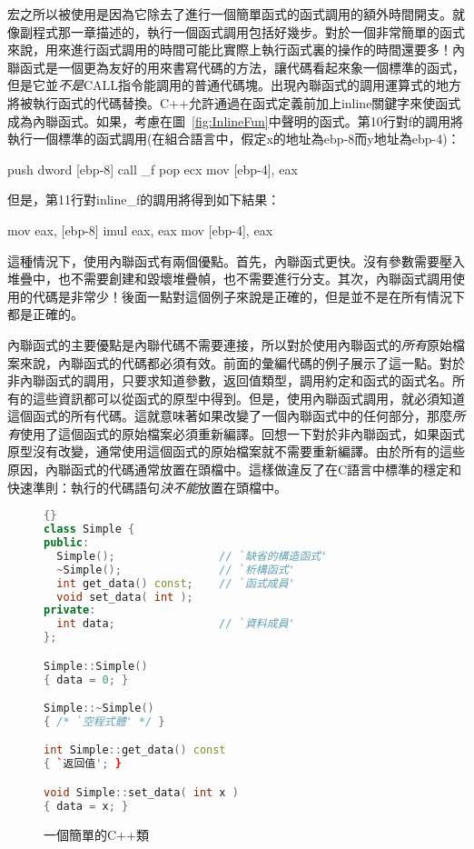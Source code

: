 宏之所以被使用是因為它除去了進行一個簡單函式的函式調用的額外時間開支。就像副程式那一章描述的，執行一個函式調用包括好幾步。對於一個非常簡單的函式來說，用來進行函式調用的時間可能比實際上執行函式裏的操作的時間還要多！內聯函式是一個更為友好的用來書寫代碼的方法，讓代碼看起來象一個標準的函式，但是它並\emph{不是}{\code CALL}指令能調用的普通代碼塊。出現內聯函式的調用運算式的地方將被執行函式的代碼替換。C++允許通過在函式定義前加上{\code inline}關鍵字來使函式成為內聯函式。如果，考慮在圖~\ref{fig:InlineFun}中聲明的函式。第10行對{\code f}的調用將執行一個標準的函式調用(在組合語言中，假定{\code x}的地址為{\code ebp-8}而{\code y}地址為{\code ebp-4})：
\begin{AsmCodeListing}
      push   dword [ebp-8]
      call   _f
      pop    ecx
      mov    [ebp-4], eax
\end{AsmCodeListing}
但是，第11行對{\code inline\_f}的調用將得到如下結果：
\begin{AsmCodeListing}
      mov    eax, [ebp-8]
      imul   eax, eax
      mov    [ebp-4], eax
\end{AsmCodeListing}

這種情況下，使用內聯函式有兩個優點。首先，內聯函式更快。沒有參數需要壓入堆疊中，也不需要創建和毀壞堆疊幀，也不需要進行分支。其次，內聯函式調用使用的代碼是非常少！後面一點對這個例子來說是正確的，但是並不是在所有情況下都是正確的。

內聯函式的主要優點是內聯代碼不需要連接，所以對於使用內聯函式的\emph{所有}原始檔案來說，內聯函式的代碼都必須有效。前面的彙編代碼的例子展示了這一點。對於非內聯函式的調用，只要求知道參數，返回值類型，調用約定和函式的函式名。所有的這些資訊都可以從函式的原型中得到。但是，使用內聯函式調用，就必須知道這個函式的所有代碼。這就意味著如果改變了一個內聯函式中的任何部分，那麼\emph{所有}使用了這個函式的原始檔案必須重新編譯。回想一下對於非內聯函式，如果函式原型沒有改變，通常使用這個函式的原始檔案就不需要重新編譯。由於所有的這些原因，內聯函式的代碼通常放置在頭檔中。這樣做違反了在C語言中標準的穩定和快速準則：執行的代碼語句\emph{決不能}放置在頭檔中。

\begin{figure}[t]
\lstset{escapeinside=`',language=Pascal,%
}
\begin{lstlisting}[language=C++,frame=tlrb]{}
class Simple {
public:
  Simple();                // `缺省的構造函式'
  ~Simple();               // `析構函式'
  int get_data() const;    // `函式成員'
  void set_data( int );
private:
  int data;                // `資料成員'
};

Simple::Simple()
{ data = 0; }

Simple::~Simple()
{ /* `空程式體' */ }

int Simple::get_data() const
{ `返回值'; }

void Simple::set_data( int x )
{ data = x; }
\end{lstlisting}
\caption{一個簡單的C++類\label{fig:SimpleClass}}
\end{figure}

